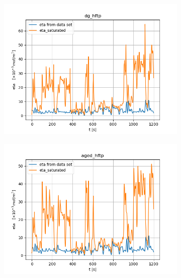 \begin{figure}[H]
        \begin{minipage}{0.49\textwidth}
                \begin{figure}[H]
                        \centering
                        \includegraphics[width=\textwidth]{./figs/14_figs/bounded_eta_plots/eta_bounds_dg_hftp.png}
                \end{figure}
        \end{minipage}
        \begin{minipage}{0.49\textwidth}
                \begin{figure}[H]
                        \centering
                        \includegraphics[width=\textwidth]{./figs/14_figs/bounded_eta_plots/eta_bounds_aged_hftp.png}
                \end{figure}
        \end{minipage}
\end{figure}

